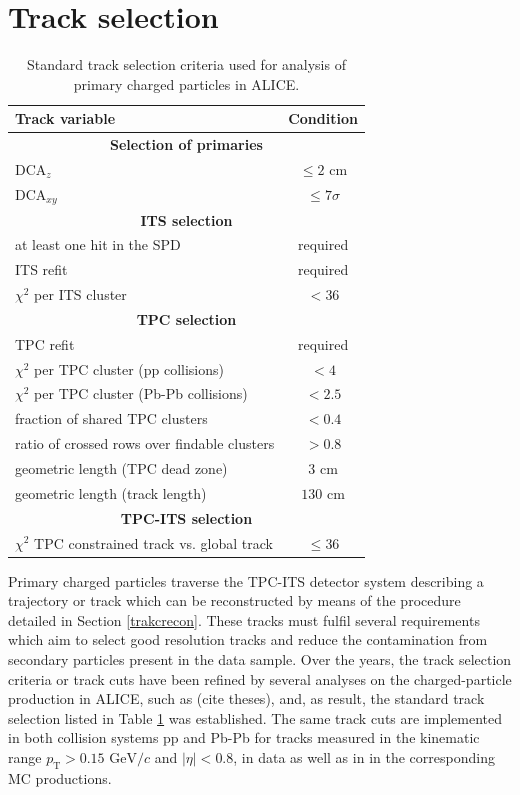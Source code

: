 \documentclass[12pt,a4paper]{report}
\begin{document}
\section{Track selection}
\label{TrackSelection}
\begin{table}[tb!]
\renewcommand{\arraystretch}{1.5}
\centering
\begin{tabular}{l c}
\toprule
\rowcolor{headerBlue}  \textbf{Track variable} &  \textbf{Condition} \\
\midrule
\multicolumn{2}{c}{\textbf{Selection of primaries}} \\
\midrule
$\text{DCA}_{z}$ & $\leq 2 $ cm\\
$\text{DCA}_{xy}$ & $\leq 7\sigma$ \\
\midrule
\multicolumn{2}{c}{\textbf{ITS selection}} \\
\midrule
at least one hit in the SPD & required \\
ITS refit &  required\\
$\chi^2$ per ITS cluster  & $< 36$ \\
\midrule
\multicolumn{2}{c}{\textbf{TPC selection}} \\
\midrule
TPC refit &  required\\
$\chi^2$ per TPC cluster (pp collisions) & $< 4$ \\
$\chi^2$ per TPC cluster (Pb-Pb collisions) & $< 2.5$ \\
fraction of shared  TPC clusters&  $<  0.4$\\
ratio of crossed rows over findable clusters  & $> 0.8$ \\
geometric length (TPC dead zone) & $3$ cm  \\
geometric length (track length) & $130$ cm \\
\midrule
\multicolumn{2}{c}{\textbf{TPC-ITS selection}} \\
\midrule
$\chi^2$ TPC constrained track vs. global track  & $\leq 36$ \\
\bottomrule
\end{tabular}
\caption{Standard track selection criteria used for analysis of primary charged particles in ALICE.}
\label{tab:Cuts}
\end{table}
Primary charged particles traverse the TPC-ITS detector system describing a trajectory or track which can be reconstructed by means of the procedure detailed in Section \ref{trakcrecon}. These tracks must fulfil several requirements which aim to select good resolution tracks and reduce the contamination from secondary particles present in the data sample. Over the years, the track selection criteria or track cuts have been refined by several analyses on the charged-particle production in ALICE, such as (cite theses), and, as result, the standard track selection listed in Table \ref{tab:Cuts} was established. The same track cuts are implemented in both collision systems pp and Pb-Pb for tracks measured in the kinematic range $p_\text{T} > 0.15\text{ GeV}/c$ and $|\eta| < 0.8$, in data as well as in in the corresponding MC productions. 
\iffalse
\end{document}
